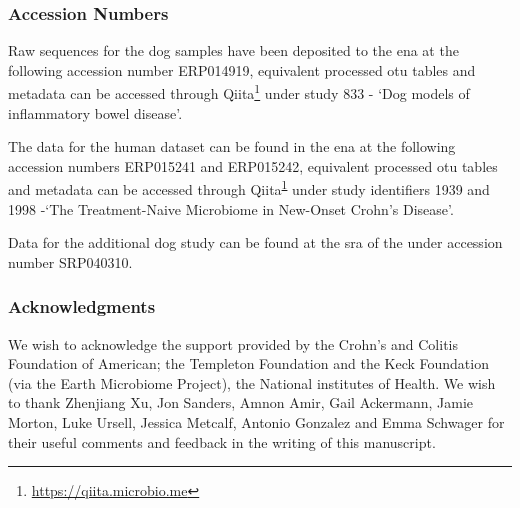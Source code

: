 \subsubsection{Accession Numbers}

Raw sequences for the dog samples have been deposited to the \gls{ena} at the following accession number ERP014919, equivalent processed \gls{otu} tables and metadata can be accessed through Qiita\footnote{\label{qiitaurl}\url{https://qiita.microbio.me}} under study 833 - `Dog models of inflammatory bowel disease'.

The data for the human dataset\cite{RN154} can be found in the \gls{ena} at the following accession numbers ERP015241 and ERP015242, equivalent processed \gls{otu} tables and metadata can be accessed through Qiita\textsuperscript{\ref{qiitaurl}} under study identifiers 1939 and 1998 -`The Treatment-Naive Microbiome in New-Onset Crohn's Disease'.

Data for the additional dog study \cite{RN153} can be found at the \gls{sra} of the under accession number SRP040310.

\subsubsection{Acknowledgments}

We wish to acknowledge the support provided by the Crohn's and Colitis Foundation of American; the Templeton Foundation and the Keck Foundation (via the Earth Microbiome Project), the National institutes of Health. We wish to thank Zhenjiang Xu, Jon Sanders, Amnon Amir, Gail Ackermann, Jamie Morton, Luke Ursell, Jessica Metcalf, Antonio Gonzalez and Emma Schwager for their useful comments and feedback in the writing of this manuscript. 
